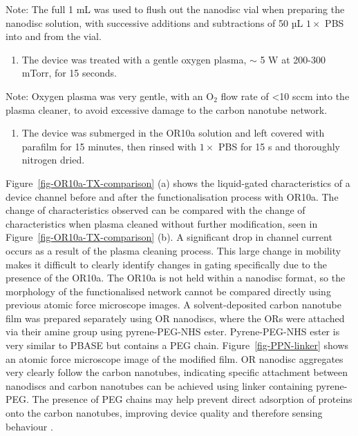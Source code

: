 \documentclass[
  a4paper,
]{scrbook}
\providecommand{\tightlist}{%
  \setlength{\itemsep}{0pt}\setlength{\parskip}{0pt}}\usepackage{longtable,booktabs,array}
\begin{document}
Note: The full 1 mL was used to flush out the nanodisc vial when
preparing the nanodisc solution, with successive additions and
subtractions of 50 µL \(1 \times\) PBS into and from the vial.

\begin{enumerate}
\def\labelenumi{\arabic{enumi}.}
\setcounter{enumi}{3}
\tightlist
\item
  The device was treated with a gentle oxygen plasma, \(\sim\) 5 W at
  200-300 mTorr, for 15 seconds.
\end{enumerate}

Note: Oxygen plasma was very gentle, with an O\(_2\) flow rate of
\textless10 sccm into the plasma cleaner, to avoid excessive damage to
the carbon nanotube network.

\begin{enumerate}
\def\labelenumi{\arabic{enumi}.}
\setcounter{enumi}{4}
\tightlist
\item
  The device was submerged in the OR10a solution and left covered with
  parafilm for 15 minutes, then rinsed with \(1 \times\) PBS for 15 s
  and thoroughly nitrogen dried.
\end{enumerate}

Figure~\ref{fig-OR10a-TX-comparison} (a) shows the liquid-gated
characteristics of a device channel before and after the
functionalisation process with OR10a. The change of characteristics
observed can be compared with the change of characteristics when plasma
cleaned without further modification, seen in
Figure~\ref{fig-OR10a-TX-comparison} (b). A significant drop in channel
current occurs as a result of the plasma cleaning process. This large
change in mobility makes it difficult to clearly identify changes in
gating specifically due to the presence of the OR10a. The OR10a is not
held within a nanodisc format, so the morphology of the functionalised
network cannot be compared directly using previous atomic force
microscope images. A solvent-deposited carbon nanotube film was prepared
separately using OR nanodiscs, where the ORs were attached via their
amine group using pyrene-PEG-NHS ester. Pyrene-PEG-NHS ester is very
similar to PBASE but contains a PEG chain. Figure~\ref{fig-PPN-linker}
shows an atomic force microscope image of the modified film. OR nanodisc
aggregates very clearly follow the carbon nanotubes, indicating specific
attachment between nanodiscs and carbon nanotubes can be achieved using
linker containing pyrene-PEG. The presence of PEG chains may help
prevent direct adsorption of proteins onto the carbon nanotubes,
improving device quality and therefore sensing behaviour
\autocite{Star2003a,Chen2004}.
\end{document}
